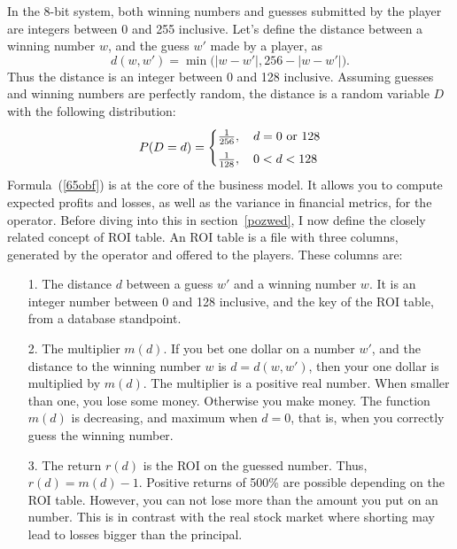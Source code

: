 \documentclass[oneside,10pt]{book}
\begin{document}
In the 8-bit system, both winning numbers and guesses submitted by the player are integers between 0 and 255 inclusive. Let's define the distance between a winning number $w$, and the guess $w'$ made by a player, as
\begin{equation}
d(w, w') = \min\Big(|w - w'|, 256 - |w - w'|\Big).\label{uyr4bg}
\end{equation}
Thus the distance is an integer between 0 and 128 inclusive. Assuming guesses and winning numbers are perfectly random, the distance is a random variable $D$ with the following distribution:
\begin{eqnarray}\label{65obf}
  P(D = d) =
    \begin{cases}
      \frac{1}{256}, & \, d=0 \text{ or } 128 \vspace{1ex}\\
      \frac{1}{128}, & \, 0<d<128
    \end{cases}
\end{eqnarray}
Formula~(\ref{65obf}) is at the core of the business model. It allows you to compute expected profits and losses, as well as the variance in financial metrics, for the operator.
 Before diving into this in section~\ref{pozwed}, I now define the closely related concept of ROI table.
An ROI table is a file with three columns, generated by the operator and offered to the players. These columns are: \vspace{1ex}
\begin{itemize}
\item[1.] The distance $d$ between a guess $w'$ and a winning number $w$. It is an integer number between 0 and 128 inclusive, and the key of the ROI table, from a database standpoint.
\item[2.] The multiplier $m(d)$. If you bet one dollar on a number $w'$, and the distance to the  winning number $w$
  is  $d = d(w, w')$, then your one dollar is multiplied by $m(d)$. The multiplier is a positive real number. When smaller than one,
 you  lose some money. Otherwise you make money. The function $m(d)$ is decreasing, and maximum when $d=0$, that is, when you correctly guess the winning number.
\item[3.] The return $r(d)$ is the ROI on the guessed number. Thus, $r(d)=m(d)-1$. Positive returns of 500\% are possible
 depending on the ROI table. However, you can not lose more than the amount you put on an number. This is in contrast with the real stock market where shorting may lead to losses bigger than the principal.
\end{itemize} \vspace{1ex}
\end{document}
